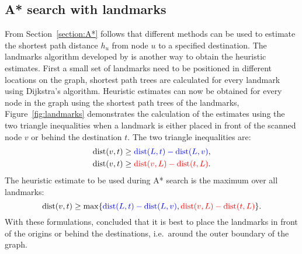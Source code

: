 \subsection{A* search with landmarks}
From Section~\ref{section:A*} follows that
different methods can be used to estimate the shortest path distance $h_u$ from node $u$ to a specified destination.
The landmarks algorithm developed by \citet{GoldbergLandmarks} is another way to obtain the heuristic estimates.
First a small set of landmarks need to be positioned in different locations on the graph,
shortest path trees are calculated for every landmark using Dijkstra's algorithm.
Heuristic estimates can now be obtained for every node in the graph using the shortest path trees of the landmarks,
Figure~\ref{fig:landmarks} demonstrates the calculation of the estimates using the two triangle inequalities when a landmark is either placed in front of the scanned node $v$ or behind the destination $t$.
The two triangle inequalities are:
\begin{align}
     \text{dist}(v, t) & \geq \textcolor{blue}{\text{dist}(L,t)-\text{dist}(L,v)}, \\
     \text{dist}(v, t) & \geq \textcolor{red}{\text{dist}(v,L)-\text{dist}(t,L)}.
\end{align}
The heuristic estimate to be used during A* search is the maximum over all landmarks:
\begin{equation}
  \text{dist}(v,t) \geq \max\{ \textcolor{blue}{\text{dist}(L,t)-\text{dist}(L,v)}, \textcolor{red}{\text{dist}(v,L)-\text{dist}(t,L)} \}.
\end{equation}
With these formulations, \citet{GoldbergLandmarks} concluded that it is best to place the landmarks in front of the origins or behind the destinations,
i.e.\ around the outer boundary of the graph.

